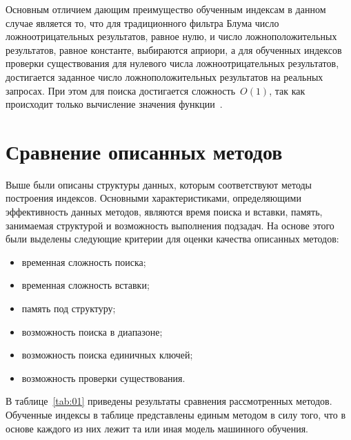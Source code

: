 Основным отличием дающим преимущество обученным индексам в данном случае
является то, что для традиционного фильтра Блума число ложноотрицательных
результатов, равное нулю, и число ложноположительных результатов, равное
константе, выбираются априори, а для обученных индексов проверки существования
для нулевого числа ложноотрицательных результатов, достигается заданное число
ложноположительных результатов на реальных запросах. При этом для поиска
достигается сложность~$O(1)$, так как происходит только вычисление значения
функции~\cite{main}.


\clearpage
\section{Сравнение описанных методов\label{classification}}

Выше были описаны структуры данных, которым соответствуют методы построения
индексов. Основными характеристиками, определяющими эффективность данных
методов, являются время поиска и вставки, память, занимаемая структурой и
возможность выполнения подзадач. На основе этого были выделены следующие
критерии для оценки  качества описанных методов:

\begin{itemize}
    \item временная сложность поиска;
    \item временная сложность вставки;
    \item память под структуру;
    \item возможность поиска в диапазоне;
    \item возможность поиска единичных ключей;
    \item возможность проверки существования.
\end{itemize}

В таблице~\ref{tab:01} приведены результаты сравнения рассмотренных методов.
Обученные индексы в таблице представлены единым методом в силу того, что в
основе каждого из них лежит та или иная модель машинного обучения.

